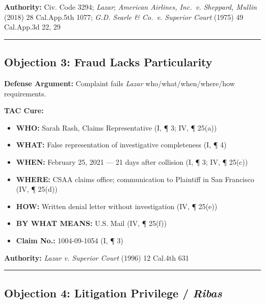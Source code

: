 \textbf{Authority:} Civ. Code \textsection{} 3294; \emph{Lazar}; \emph{American Airlines, Inc.~v. Sheppard, Mullin} (2018) 28 Cal.App.5th 1077; \emph{G.D. Searle \& Co.~v. Superior Court} (1975) 49 Cal.App.3d 22, 29

\begin{center}\rule{0.5\linewidth}{0.5pt}\end{center}

\subsection{Objection 3: Fraud Lacks Particularity}\label{objection-3-fraud-lacks-particularity}

\textbf{Defense Argument:} Complaint fails \emph{Lazar} who/what/when/where/how requirements.

\textbf{TAC Cure:}

\begin{itemize}
\tightlist
\item
  \textbf{WHO:} Sarah Rash, Claims Representative (\textsection{}I, ¶ 3; \textsection{}IV, ¶ 25(a))
\item
  \textbf{WHAT:} False representation of investigative completeness (\textsection{}I, ¶ 4)
\item
  \textbf{WHEN:} February 25, 2021 --- 21 days after collision (\textsection{}I, ¶ 3; \textsection{}IV, ¶ 25(c))
\item
  \textbf{WHERE:} CSAA claims office; communication to Plaintiff in San Francisco (\textsection{}IV, ¶ 25(d))
\item
  \textbf{HOW:} Written denial letter without investigation (\textsection{}IV, ¶ 25(e))
\item
  \textbf{BY WHAT MEANS:} U.S. Mail (\textsection{}IV, ¶ 25(f))
\item
  \textbf{Claim No.:} 1004-09-1054 (\textsection{}I, ¶ 3)
\end{itemize}

\textbf{Authority:} \emph{Lazar v. Superior Court} (1996) 12 Cal.4th 631

\begin{center}\rule{0.5\linewidth}{0.5pt}\end{center}

\subsection{\texorpdfstring{Objection 4: Litigation Privilege / \emph{Ribas}}{Objection 4: Litigation Privilege / Ribas}}\label{objection-4-litigation-privilege-ribas}

